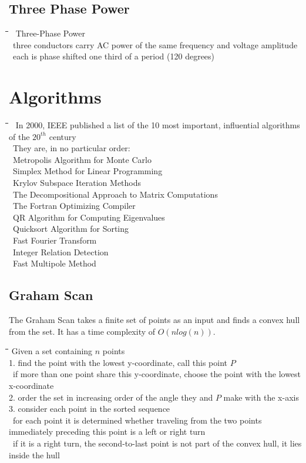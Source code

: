 \documentclass[10pt,letterpaper]{scrartcl}
\newcommand{\tbul}{\textbullet}
\newcommand{\tend}{\>\textendash}
\newcommand{\tasc}{\>\>\textasteriskcentered}
\newcommand{\tabDef}{\hspace{2em}\=\hspace{2em}\=\hspace{2em}\=\hspace{2em}\=\kill}
\begin{document}
\subsection{Three Phase Power}
\begin{tabbing}\tabDef 
\tbul\ Three-Phase Power \\
    \tend\ three conductors carry AC power of the same frequency and voltage amplitude \\
        \tasc\ each is phase shifted one third of a period (120 degrees)
\end{tabbing}

\newpage 
\section{Algorithms}
\begin{tabbing}\tabDef
\tbul\ In 2000, IEEE published a list of the 10 most important, influential algorithms of the $20^{th}$ century \\
\tbul\ They are, in no particular order: \\
	\tend\ Metropolis Algorithm for Monte Carlo \\
    \tend\ Simplex Method for Linear Programming \\
    \tend\ Krylov Subspace Iteration Methods\\
    \tend\ The Decompositional Approach to Matrix Computations \\
    \tend\ The Fortran Optimizing Compiler\\
    \tend\ QR Algorithm for Computing Eigenvalues\\
    \tend\ Quicksort Algorithm for Sorting \\
    \tend\ Fast Fourier Transform \\
    \tend\ Integer Relation Detection\\
    \tend\ Fast Multipole Method
\end{tabbing}
\subsection{Graham Scan}
The Graham Scan takes a finite set of points as an input and finds a convex hull from the set. It has a time complexity of $O(nlog(n))$. 
\begin{tabbing}\tabDef
Given a set containing $n$ points \\
1. find the point with the lowest y-coordinate, call this point $P$ \\
    \tend\ if more than one point share this y-coordinate, choose the point with the lowest x-coordinate \\
2. order the set in increasing order of the angle they and $P$ make with the x-axis \\
3. consider each point in the sorted sequence \\
    \tend\ for each point it is determined whether traveling from the two points immediately preceding this point is a left or right turn \\
        \tasc\ if it is a right turn, the second-to-last point is not part of the convex hull, it lies inside the hull \\
\end{tabbing}
\end{document}
